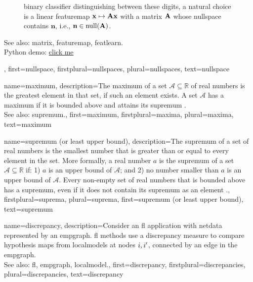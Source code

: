 {{\begin{figure}[H]
{			binary \gls{classifier} distinguishing between these digits, a natural choice is 
			a linear \gls{featuremap} ${\bf x} \mapsto \mathbf{A}{\bf x}$ with a 
			\gls{matrix} ${\bf A}$ whose nullspace contains $\mathbf{n}$, i.e., $\mathbf{n} \in \mathrm{null}({\bf A})$.
                \label{fig:nullspace-rotation-dict}}	
	       	\end{figure}
		See also: \gls{matrix}, \gls{featuremap}, \gls{featlearn}. \\ 
		Python demo: \href{https://github.com/AaltoDictionaryofML/AaltoDictionaryofML.github.io/blob/main/assets/pythonsnacks/nullspace.py}{click me}},
 	first={nullspace},
 	firstplural={nullspaces},
 	plural={nullspaces},
 	text={nullspace}
}


{name={maximum},
	description={The maximum of a set $\mathcal{A} \subseteq \mathbb{R}$ 
     		of real numbers is the greatest element in that set, if such an element exists. A set $\mathcal{A}$ 
     		has a maximum if it is bounded above and attains its \gls{supremum} \cite[Sec.~1.4]{RudinBookPrinciplesMatheAnalysis}.
				\\ 
		See also: \gls{supremum}.},
 	first={maximum},
 	firstplural={maxima},
 	plural={maxima},
 	text={maximum}
}

{name={supremum (or least upper bound)},
	description={The supremum of a set of real numbers is 
		the smallest number that is greater than or equal to every element in the set. More formally, a 
		real number $a$ is the supremum of a set $\mathcal{A} \subseteq \mathbb{R}$ if: 1) $a$ 
		is an upper bound of $\mathcal{A}$; and 2) no number smaller than $a$ is an upper bound of $\mathcal{A}$. 
		Every non-empty set of real numbers that is bounded above has a supremum, even if it does 
		not contain its supremum as an element \cite[Sec.~1.4]{RudinBookPrinciplesMatheAnalysis}.},
	firstplural={suprema}, 
  	plural={suprema},
	first={supremum (or least upper bound)},
	text={supremum}
}

{name={discrepancy},
	description={Consider an \gls{fl} application with \gls{netdata} 
		represented by an \gls{empgraph}. \gls{fl} methods use a discrepancy measure 
		to compare \gls{hypothesis} \glspl{map} from \glspl{localmodel} at nodes $i,i'$, 
		connected by an edge in the \gls{empgraph}.
					\\ 
		See also: \gls{fl}, \gls{empgraph}, \gls{localmodel}.},
	first={discrepancy},
	firstplural={discrepancies}, 
  	plural={discrepancies}, 
	text={discrepancy}
}


